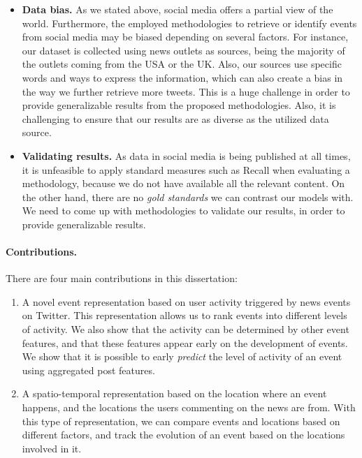 \begin{intro}
\begin{itemize}
    \item {\bf Data bias.}
    As we stated above, social media offers a partial view of the world. 
    Furthermore, the employed methodologies to retrieve or identify events from
    social media may be biased depending on several factors. 
    For instance, our dataset is collected using news outlets as sources, being
    the majority of the outlets coming from the USA or the UK. 
    Also, our sources use specific words and ways to express the information,
    which can also create a bias in the way we further retrieve more tweets.
    This is a huge challenge in order to provide generalizable results from the
    proposed methodologies. 
    Also, it is challenging to ensure that our results are as diverse as the
    utilized data source. 

    \item {\bf Validating results.} 
    As data in social media is being published at all times, it is unfeasible to
    apply standard measures such as Recall when evaluating a methodology,
    because we do not have available all the relevant content.
    On the other hand, there are no {\em gold standards} we can contrast our
    models with. 
    We need to come up with methodologies to validate our results, in order to
    provide generalizable results.

    
\end{itemize}






\paragraph{Contributions.} There are four main contributions in this dissertation:

\begin{enumerate}
\item A novel event representation based on user activity triggered by news
events on Twitter. 
%
This representation allows us to rank events into different levels of activity. 
%
We also show that the activity can be determined by other event features, and
that these features appear early on the development of events.
%
We show that it is possible to early {\em predict} the level of activity of an
event using aggregated post features.

\item A spatio-temporal representation based on the location where an event
happens, and the locations the users commenting on the news are from.
%
With this type of representation, we can compare events and locations based on
different factors, and track the evolution of an event based on the locations
involved in it.


\end{enumerate}
\end{intro}
